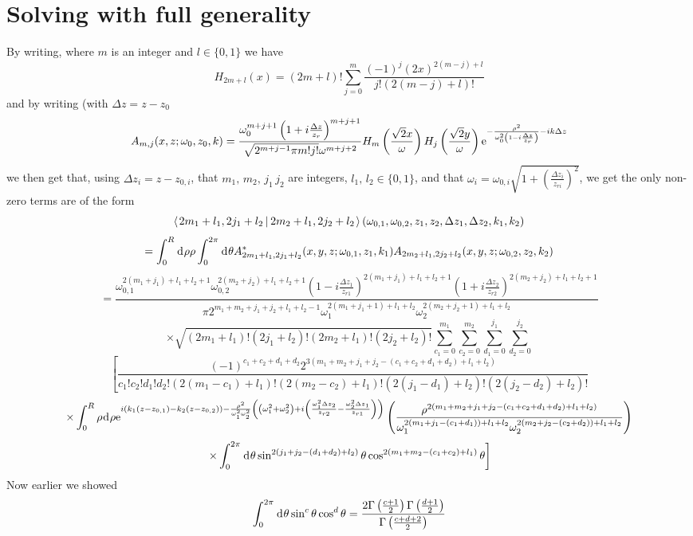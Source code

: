 \documentclass[11pt]{amsart}
\makeatletter
\newcommand{\e}{{\rm e}}				%
\newcommand{\msp}[1]{\mspace{#1mu}}		%
\newcommand{\0}{\varnothing}		%
\newcommand{\dd}{\msp{1} {\rm{d}} \msp{1}}	%
\newcommand{\brac}[2]{\left\langle\msp{2} #1\left\lvert \msp{3.5} #2 \right.\right\rangle}	%
\newcommand{\1}{!}
\newcommand{\2}{@}
\newcommand{\3}{\#}
\newcommand{\4}{\$}
\newcommand{\5}{\%}
\newcommand{\6}{$^\wedge$}
\newcommand{\7}{\&}
\newcommand{\8}{*}
\newcommand{\9}{(}
\makeatother
\begin{document}
\section{Solving with full generality}
By writing, where $m$ is an integer and $l\in\{0,1\}$ we have
\[
H_{2m+l}(x) = \left(2m+l\right)!\sum_{j=0}^{m}\frac{(-1)^{j}(2x)^{2(m-j)+l}}{j!(2(m-j)+l)!}
\]
and by writing (with $\Delta z = z-z_0$
\[
A_{m,j}(x,z;\omega_0,z_0,k) = \frac{\omega_0^{m+j+1}\left(1+i\frac{\Delta z}{z_r}\right)^{m+j+1}}{\sqrt{2^{m+j-1}\pi m!j!}\omega^{m+j+2}}H_m\left(\frac{\sqrt{2}x}{\omega}\right)H_j\left(\frac{\sqrt{2}y}{\omega}\right)\e^{-\frac{\rho^2}{\omega_0^2\left(1-i\frac{\Delta z}{z_r}\right)}-ik\Delta z}
\]
we then get that, using $\Delta z_i = z-z_{0,i}$,  that $m_1,\, m_2,\,j_1\,j_2$ are integers, $l_1,\,l_2 \in \{0,1\}$, and that $\omega_i = \omega_{0,i}\sqrt{1+\left(\frac{\Delta z_i}{z_{ri}}\right)^2}$, we get the only non-zero terms are of the form
\[
\brac{2m_1+l_1,2j_1+l_2}{2m_2+l_1,2j_2+l_2}(\omega_{0,1},\omega_{0,2},z_1,z_2,\Delta z_1,\Delta z_2,k_1,k_2)
\]
\[ =\int_0^R \dd \rho \rho\int_0^{2\pi} \dd \theta A^*_{2m_1+l_1,2j_1+l_2}(x,y,z;\omega_{0,1},z_1,k_1)A_{2m_2+l_1,2j_2+l_2}(x,y,z;\omega_{0,2},z_2,k_2)
\]
\[
=\frac{\omega_{0,1}^{2(m_1+j_1)+l_1+l_2+1}\omega_{0,2}^{2(m_2+j_2)+l_1+l_2+1}\left(1-i\frac{\Delta z_1}{z_{r1}}\right)^{2(m_1+j_1)+l_1+l_2+1}\left(1+i\frac{\Delta z_2}{z_{r2}}\right)^{2(m_2+j_2)+l_1+l_2+1}}{\pi2^{m_1+m_2+j_1+j_2+l_1+l_2-1}\omega_1^{2(m_1+j_1+1)+l_1+l_2}\omega_2^{2(m_2+j_2+1)+l_1+l_2}}
\]
\[
\times \sqrt{(2m_1+l_1)!(2j_1+l_2)!(2m_2+l_1)!(2j_2+l_2)!}\sum_{c_1=0}^{m_1}\sum_{c_2=0}^{m_2}\sum_{d_1=0}^{j_1}\sum_{d_2=0}^{j_2}
\]
\[
\left[\frac{(-1)^{c_1+c_2+d_1+d_2}2^{3(m_1+m_2+j_1+j_2-(c_1+c_2+d_1+d_2)+l_1+l_2)}}{c_1!c_2!d_1!d_2!\left(2(m_1-c_1)+l_1\right)!\left(2(m_2-c_2)+l_1\right)!\left(2(j_1-d_1)+l_2\right)!\left(2(j_2-d_2)+l_2\right)!}\right.
\]
\[
\left. \times \int_0^R\rho \dd \rho \e^{i\left(k_1(z-z_{0,1})-k_2(z-z_{0,2})\right)-\frac{\rho^2}{\omega_1^2\omega_2^2}\left(\left(\omega_1^2+\omega_2^2\right)+i\left(\frac{\omega_1^2\Delta z_2}{z_{r2}}-\frac{\omega_2^2\Delta z_1}{z_{r1}}\right)\right)}\left(\frac{\rho^{2(m_1+m_2+j_1+j_2-(c_1+c_2+d_1+d_2)+l_1+l_2)}}{\omega_1^{2(m_1+j_1-(c_1+d_1))+l_1+l_2}\omega_2^{2(m_2+j_2-(c_2+d_2))+l_1+l_2}}\right)\right.
\]
\[
\left. \times \int_0^{2\pi} \dd\theta \sin^{2(j_1+j_2-(d_1+d_2)+l_2)}\theta\cos^{2(m_1+m_2-(c_1+c_2)+l_1)}\theta\right]
\]
Now earlier we showed
\[
\int_0^{2\pi} \dd \theta \sin^c\theta \cos^d\theta = \frac{2\Gamma\left(\frac{c+1}{2}\right)\Gamma\left(\frac{d+1}{2}\right)}{\Gamma\left(\frac{c+d+2}{2}\right)}
\]
\end{document}

